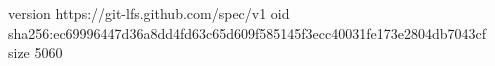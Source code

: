 version https://git-lfs.github.com/spec/v1
oid sha256:ec69996447d36a8dd4fd63c65d609f585145f3ecc40031fe173e2804db7043cf
size 5060
